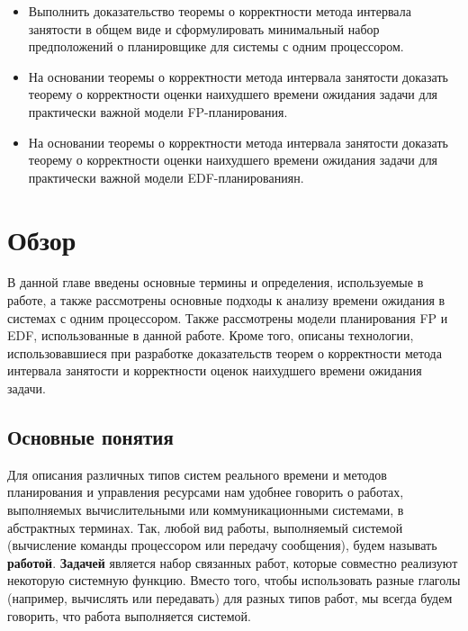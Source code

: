 \documentclass[14pt]{matmex-diploma-custom}
\begin{document}
\begin{itemize}
    \item Выполнить доказательство теоремы о корректности метода интервала занятости
      в общем виде и сформулировать минимальный набор предположений о планировщике 
      для системы с одним процессором.
    \item На основании теоремы о корректности метода интервала занятости доказать 
      теорему о корректности оценки наихудшего времени ожидания задачи для практически 
      важной модели FP-планирования.  
    \item На основании теоремы о корректности метода интервала занятости доказать 
      теорему о корректности оценки наихудшего времени ожидания задачи для практически 
      важной модели EDF-планированиян.
\end{itemize}

\section{Обзор}
В данной главе введены основные термины и определения, используемые в работе, а также 
  рассмотрены основные подходы к анализу времени ожидания в системах с одним процессором. 
  Также рассмотрены модели планирования FP и EDF, использованные в данной работе. 
  Кроме того, описаны технологии, использовавшиеся при разработке доказательств 
  теорем о корректности метода интервала занятости и корректности оценок наихудшего 
  времени ожидания задачи. 

\subsection{Основные понятия}

Для описания различных типов систем реального времени и методов планирования и управления
  ресурсами нам удобнее говорить о работах, выполняемых вычислительными 
  или коммуникационными системами, в абстрактных терминах. Так, любой вид работы, 
  выполняемый системой (вычисление команды процессором или передачу сообщения), 
  будем называть \textbf{работой}. \textbf{Задачей} является набор связанных работ, которые совместно 
  реализуют некоторую системную функцию. Вместо того, чтобы использовать разные 
  глаголы (например, вычислять или передавать) для разных типов работ, мы всегда 
  будем говорить, что работа выполняется системой. 
\end{document}
